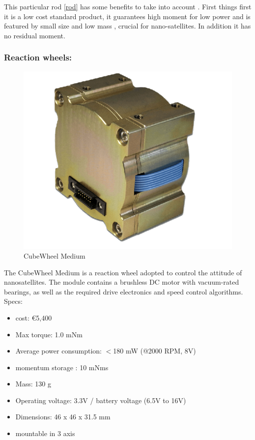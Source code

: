 \documentclass[11pt]{article}
\begin{document}
This particular rod \ref{rod} has some benefits to take into account . First things first it is a 
low cost standard product, it guarantees
high moment for low power and  is featured by
small size and low mass , crucial for nano-satellites. In addition it has no residual moment.



\subsubsection{Reaction wheels:}
\begin{figure} [H]

\centering 

\includegraphics[scale=0.38]{RW.PNG}


\caption{ CubeWheel Medium
\cite{reaction_w_medium}}
\label{RW_medium}
\end{figure}
The CubeWheel Medium is a reaction wheel adopted to control the attitude of nanosatellites. The  module contains a brushless DC motor with vacuum-rated bearings, as well as the required drive electronics and speed control algorithms. Specs:
\begin{multicols}{2}
\begin{itemize}
\item cost: \euro{5,400}
\item Max torque: 1.0 mNm
\item  Average power consumption: $<$180 mW (@2000 RPM, 8V)
\item momentum storage : 10 mNms
\item  Mass: 130 g
\item  Operating voltage: 3.3V / battery voltage (6.5V to 16V) \item Dimensions: 46 x 46 x 31.5 mm
 \item mountable in 3 axis


\end{itemize}
\end{multicols}
\end{document}

